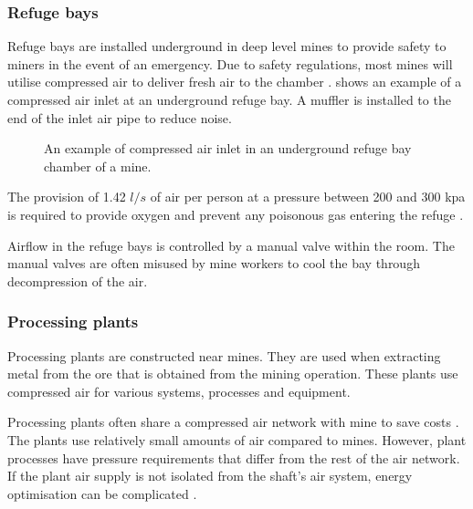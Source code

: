 \subsubsection{Refuge bays}
Refuge bays are installed underground in deep level mines to provide safety to miners in the event of an emergency. Due to safety regulations, most mines will utilise compressed air to deliver fresh air to the chamber \cite{brake1999criteria}.  shows an example of a compressed air inlet at an underground refuge bay. A muffler is installed to the end of the inlet air pipe to reduce noise.
\begin{figure}[h]
	\centering
	\caption{An example of compressed air inlet in an underground refuge bay chamber of a mine.}
	\label{fig: Refuge Bay}
\end{figure}
\par The provision of 1.42 $l/s$ of air per person at a pressure between 200 and 300 \gls{kpa} is required to provide oxygen and prevent any poisonous gas entering the refuge \cite{brake1999criteria}.
\par
Airflow in the refuge bays is controlled by a manual valve within the room. The manual valves are often misused by mine workers to cool the bay through decompression of the air. %
\subsubsection{Processing plants}
Processing plants are constructed near mines. They are used when extracting metal from the ore that is obtained from the mining operation.  These plants use compressed air for various systems, processes and equipment. 
\par 
Processing plants often share a compressed air network with mine to save costs \cite{Marais2012PhD}. The plants use relatively small amounts of air compared to mines. However, plant processes have pressure requirements that differ from the rest of the air network. If the plant air supply is not isolated from the shaft's air system, energy optimisation can be complicated \cite{Kriel2014Masters}. 
